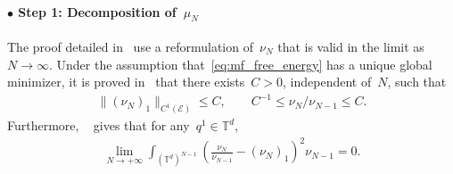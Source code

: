 \documentclass[onefignum,onetabnum]{siamart251216} %
\newcommand{\torus}{\mathbb T}
\newcommand{\real}{\mathbb R}
\newcommand{\mc}[1]{\mathcal{#1}}
\renewcommand{\leq}{\leqslant}
\newcommand{\mescin}{\mu}
\newcommand{\mespos}{\nu}
\newcommand{\mesvit}{\kappa}
\newcommand{\vq}[1]{q^{#1}}
\newcommand{\vp}[1]{p^{#1}}
\theoremstyle{plain}
\numberwithin{equation}{section}
\numberwithin{theorem}{section}
\newcounter{ucounter}
\newcommand{\uv}[1]{
  \stepcounter{ucounter}
  \textcolor{orange}{
      \\[.2cm]
    U, comment \arabic{ucounter}. #1
    \\[.2cm]
  }
}
\renewcommand{\uv}[1]{\textcolor{orange}{#1}}
\begin{document}
\paragraph{$\bullet$ Step 1: Decomposition of~$\mescin_N$}
The proof detailed in~\cite[Section 3]{delgadino2021diffusive} use a reformulation of~$\mespos_N$ that is valid in the limit as $N \to \infty$.
Under the assumption that~\eqref{eq:mf_free_energy} has a unique global minimizer, it is proved in~\cite[Proof of Theorem 1.16]{delgadino2021diffusive} that there exists~$C> 0$, independent of~$N$, such that
\begin{align}
    \label{eq:bound_inf_ratio_ZN}
    \|(\mespos_N)_1\|_{C^1(\mc{E})} \leq C,\qquad
    C^{-1} \leq \mespos_N/\mespos_{N-1} \leq C.
\end{align}
Furthermore,
~\cite[Proof of Theorem 1.16]{delgadino2021diffusive} gives that for any~$\vq{1} \in \torus^d$,
\begin{align}
    \label{eq:result_marg_delgadino2021diffusive}
    \lim\limits_{N \rightarrow +\infty} \int_{(\torus^d)^{N-1}}\left(\frac{\mespos_N}{\mespos_{N-1}} - (\mespos_N)_1\right)^2 \mespos_{N-1} = 0.
\end{align}

\end{document}
